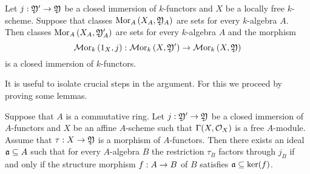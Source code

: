 \begin{theorem}\label{theorem:closedimmersionsandinternalhom}
Let $j:{\mathfrak Y}'\rightarrow {\mathfrak Y}$ be a closed immersion of $k$-functors and $X$ be a locally free $k$-scheme. Suppose that classes $\mathrm{Mor}_A\left(X_A,{\mathfrak Y}_A\right)$ are sets for every $k$-algebra $A$. Then classes $\mathrm{Mor}_A\left(X_A,{\mathfrak Y}'_A\right)$ are sets for every $k$-algebra $A$ and the morphism
$$\mathcal{M}\mathrm{or}_k\left(1_X,j\right):\mathcal{M}\mathrm{or}_k\left(X,{\mathfrak Y}'\right)\rightarrow \mathcal{M}\mathrm{or}_k\left(X,{\mathfrak Y}\right)$$
is a closed immersion of $k$-functors.
\end{theorem}
\noindent
It is useful to isolate crucial steps in the argument. For this we proceed by proving some lemmas.

\begin{lemma}\label{lemma:foraffinelocalfactorization}
Suppose that $A$ is a commutative ring. Let $j:{\mathfrak Y}'\rightarrow {\mathfrak Y}$ be a closed immersion of $A$-functors and $X$ be an affine $A$-scheme such that $\Gamma(X,{\mathcal O}_X)$ is a free $A$-module. Assume that $\tau:X\rightarrow {\mathfrak Y}$ is a morphism of $A$-functors. Then there exists an ideal $\mathfrak{a}\subseteq A$ such that for every $A$-algebra $B$ the restriction $\tau_B$ factors through $j_B$ if and only if the structure morphism $f:A\rightarrow B$ of $B$ satisfies $\mathfrak{a}\subseteq \ker(f)$.
\end{lemma}
